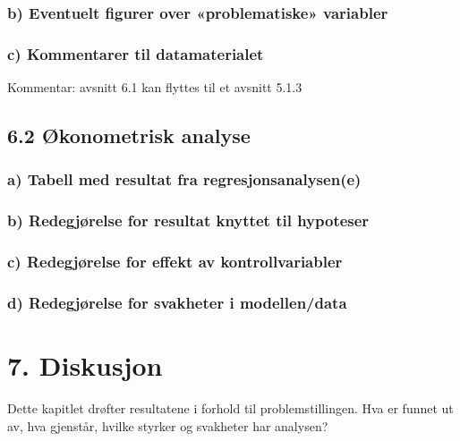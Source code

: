 \documentclass[
  11pt,
  a4paper,
  DIV=11,
  numbers=noendperiod]{scrartcl}
\begin{document}
\subsubsection{b) Eventuelt figurer over «problematiske»
variabler}\label{b-eventuelt-figurer-over-problematiske-variabler}

\subsubsection{c) Kommentarer til
datamaterialet}\label{c-kommentarer-til-datamaterialet}

Kommentar: avsnitt 6.1 kan flyttes til et avsnitt 5.1.3

\subsection{6.2 Økonometrisk analyse}\label{uxf8konometrisk-analyse}

\subsubsection{a) Tabell med resultat fra
regresjonsanalysen(e)}\label{a-tabell-med-resultat-fra-regresjonsanalysene}

\subsubsection{b) Redegjørelse for resultat knyttet til
hypoteser}\label{b-redegjuxf8relse-for-resultat-knyttet-til-hypoteser}

\subsubsection{c) Redegjørelse for effekt av
kontrollvariabler}\label{c-redegjuxf8relse-for-effekt-av-kontrollvariabler}

\subsubsection{d) Redegjørelse for svakheter i
modellen/data}\label{d-redegjuxf8relse-for-svakheter-i-modellendata}

\section{7. Diskusjon}\label{diskusjon}

Dette kapitlet drøfter resultatene i forhold til problemstillingen. Hva
er funnet ut av, hva gjenstår, hvilke styrker og svakheter har analysen?
\end{document}
